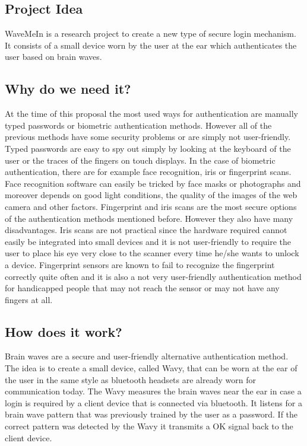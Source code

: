 \documentclass[a4paper,11pt]{article}
\begin{document}
\subsection{Project Idea}
WaveMeIn is a research project to create a new type of secure login mechanism. It consists of a small device worn by the user at the ear which authenticates the user based on brain waves.

\subsection{Why do we need it?}
At the time of this proposal the most used ways for authentication are manually typed passwords or biometric authentication methods. However all of the previous methods have some security problems or are simply not user-friendly. Typed passwords are easy to spy out simply by looking at the keyboard of the user or the traces of the fingers on touch displays. In the case of biometric authentication, there are for example face recognition, iris or fingerprint scans. Face recognition software can easily be tricked by face masks or photographs and moreover depends on good light conditions, the quality of the images of the web camera and other factors. Fingerprint and iris scans are the most secure options of the authentication methods mentioned before. However they also have many disadvantages. Iris scans are not practical since the hardware required cannot easily be integrated into small devices and it is not user-friendly to require the user to place his eye very close to the scanner every time he/she wants to unlock a device. Fingerprint sensors are known to fail to recognize the fingerprint correctly quite often and it is also a not very user-friendly authentication method for handicapped people that may not reach the sensor or may not have any fingers at all. 

\subsection{How does it work?}
Brain waves are a secure and user-friendly alternative authentication method. The idea is to create a small device, called Wavy, that can be worn at the ear of the user in the same style as bluetooth headsets are already worn for communication today. The Wavy measures the brain waves near the ear in case a login is required by a client device that is connected via bluetooth. It listens for a brain wave pattern that was previously trained by the user as a password. If the correct pattern was detected by the Wavy it transmits a OK signal back to the client device. 
\end{document}
